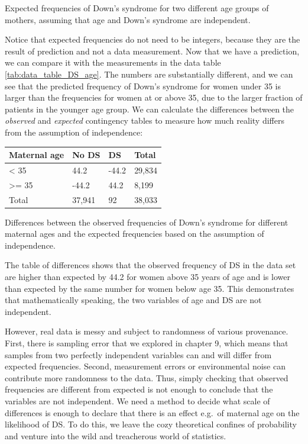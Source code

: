 \documentclass[
]{book}
\theoremstyle{definition}
\theoremstyle{definition}
\theoremstyle{definition}
\theoremstyle{remark}
\begin{document}
Expected frequencies of Down's syndrome for two different age groups of mothers, assuming that age and Down's syndrome are independent.

Notice that expected frequencies do not need to be integers, because they are the result of prediction and not a data measurement. Now that we have a prediction, we can compare it with the measurements in the data table \ref{tab:data_table_DS_age}. The numbers are substantially different, and we can see that the predicted frequency of Down's syndrome for women under 35 is larger than the frequencies for women at or above 35, due to the larger fraction of patients in the younger age group. We can calculate the differences between the \emph{observed} and \emph{expected} contingency tables to measure how much reality differs from the assumption of independence:

\begin{longtable}[]{@{}llll@{}}
\toprule
Maternal age & No DS & DS & Total\tabularnewline
\midrule
\endhead
\textless{} 35 & 44.2 & -44.2 & 29,834\tabularnewline
\textgreater= 35 & -44.2 & 44.2 & 8,199\tabularnewline
Total & 37,941 & 92 & 38,033\tabularnewline
\bottomrule
\end{longtable}

Differences between the observed frequencies of Down's syndrome for different maternal ages and the expected frequencies based on the assumption of independence.

The table of differences shows that the observed frequency of DS in the data set are higher than expected by 44.2 for women above 35 years of age and is lower than expected by the same number for women below age 35. This demonstrates that mathematically speaking, the two variables of age and DS are not independent.

However, real data is messy and subject to randomness of various provenance. First, there is sampling error that we explored in chapter 9, which means that samples from two perfectly independent variables can and will differ from expected frequencies. Second, measurement errors or environmental noise can contribute more randomness to the data. Thus, simply checking that observed frequencies are different from expected is not enough to conclude that the variables are not independent. We need a method to decide what scale of differences is enough to declare that there is an effect e.g.~of maternal age on the likelihood of DS. To do this, we leave the cozy theoretical confines of probability and venture into the wild and treacherous world of statistics.
\end{document}
